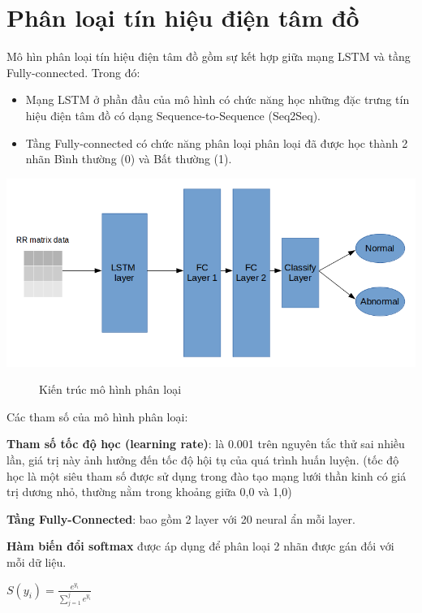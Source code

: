 \section{Phân loại tín hiệu điện tâm đồ}
Mô hìn phân loại tín hiệu điện tâm đồ gồm sự kết hợp giữa mạng LSTM và tầng Fully-connected. Trong đó:
\begin{itemize}
    \item Mạng LSTM ở phần đầu của mô hình có chức năng học những đặc trưng tín hiệu điện tâm đồ có dạng Sequence-to-Sequence (Seq2Seq). 
    \item Tầng Fully-connected có chức năng phân loại phân loại đã được học thành 2 nhãn Bình thường (0) và Bất thường (1).
\end{itemize}
\begin{center}
    \includegraphics[scale=.4]{image/chapter5/model_architechture.png}
    \begin{figure}[htp]
    \begin{center}
    \end{center}
    \caption{Kiến trúc mô hình phân loại}
    \end{figure}
\end{center}
Các tham số của mô hình phân loại:

\textbf{Tham số tốc độ học (learning rate)}: là 0.001 trên nguyên tắc thử sai nhiều lần, giá trị này ảnh hưởng đến tốc độ hội tụ của quá trình huấn luyện. (tốc độ học là một siêu tham số  được sử dụng trong đào tạo mạng lưới thần kinh có giá trị dương nhỏ, thường nằm trong khoảng giữa 0,0 và 1,0)\par
\textbf{Tầng Fully-Connected}: bao gồm 2 layer với 20 neural ẩn mỗi layer.\par
\textbf{Hàm biến đổi softmax} được áp dụng để phân loại 2 nhãn được gán đối với mỗi dữ liệu.\par
$S(y_i) = \frac{e^{y_i}}{\sum_{j=1}^{j}e^{y_i}}$ \par

